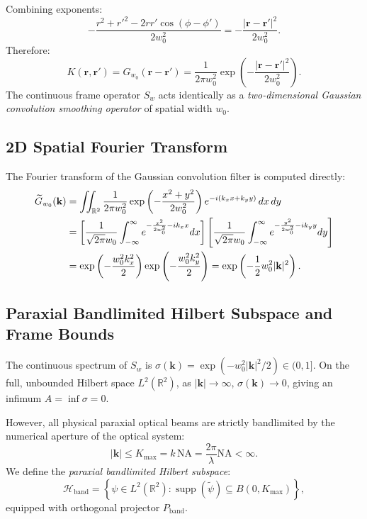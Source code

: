 \documentclass{optica-article}
\begin{document}
Combining exponents:
\begin{equation}
- \frac{r^2 + r'^2 - 2 r r' \cos(\phi - \phi')}{2 w_0^2} = - \frac{|\mathbf{r} - \mathbf{r}'|^2}{2 w_0^2}.
\label{eq:coordinate_difference}
\end{equation}
Therefore:
\begin{equation}
\boxed{K(\mathbf{r}, \mathbf{r}') = G_{w_0}(\mathbf{r} - \mathbf{r}') = \frac{1}{2\pi w_0^2} \exp\left( - \frac{|\mathbf{r} - \mathbf{r}'|^2}{2 w_0^2} \right).}
\label{eq:gaussian_kernel}
\end{equation}
The continuous frame operator $S_w$ acts identically as a \emph{two-dimensional Gaussian convolution smoothing operator} of spatial width $w_0$.

\subsection{2D Spatial Fourier Transform}

The Fourier transform of the Gaussian convolution filter is computed directly:
\begin{align}
\widetilde{G}_{w_0}(\mathbf{k}) &= \iint_{\mathbb{R}^2} \frac{1}{2\pi w_0^2} \exp\left( - \frac{x^2 + y^2}{2 w_0^2} \right) e^{-i(k_x x + k_y y)} \, dx \, dy \notag \\
&= \left[ \frac{1}{\sqrt{2\pi} w_0} \int_{-\infty}^\infty e^{-\frac{x^2}{2 w_0^2} - i k_x x} dx \right] \left[ \frac{1}{\sqrt{2\pi} w_0} \int_{-\infty}^\infty e^{-\frac{y^2}{2 w_0^2} - i k_y y} dy \right] \notag \\
&= \exp\left( - \frac{w_0^2 k_x^2}{2} \right) \exp\left( - \frac{w_0^2 k_y^2}{2} \right) = \exp\left( - \frac{1}{2} w_0^2 |\mathbf{k}|^2 \right).
\label{eq:fourier_kernel}
\end{align}

\subsection{Paraxial Bandlimited Hilbert Subspace and Frame Bounds}

The continuous spectrum of $S_w$ is $\sigma(\mathbf{k}) = \exp(-w_0^2 |\mathbf{k}|^2 / 2) \in (0, 1]$. On the full, unbounded Hilbert space $L^2(\mathbb{R}^2)$, as $|\mathbf{k}| \to \infty$, $\sigma(\mathbf{k}) \to 0$, giving an infimum $A = \inf \sigma = 0$.

However, all physical paraxial optical beams are strictly bandlimited by the numerical aperture of the optical system:
\begin{equation}
|\mathbf{k}| \le K_{\max} = k \, \text{NA} = \frac{2\pi}{\lambda} \text{NA} < \infty.
\label{eq:kmax_na}
\end{equation}
We define the \emph{paraxial bandlimited Hilbert subspace}:
\begin{equation}
\mathcal{H}_{\text{band}} = \left\{ \psi \in L^2(\mathbb{R}^2) : \operatorname{supp}(\widetilde{\psi}) \subseteq B(0, K_{\max}) \right\},
\label{eq:h_band_def}
\end{equation}
equipped with orthogonal projector $P_{\text{band}}$.
\end{document}
